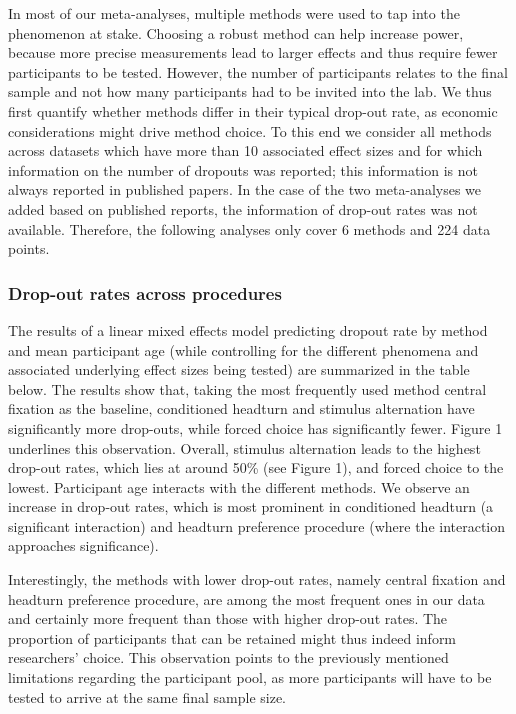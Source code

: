 \documentclass[english,floatsintext,man]{apa6}
\begin{document}
In most of our meta-analyses, multiple methods were used to tap into the
phenomenon at stake. Choosing a robust method can help increase power,
because more precise measurements lead to larger effects and thus
require fewer participants to be tested. However, the number of
participants relates to the final sample and not how many participants
had to be invited into the lab. We thus first quantify whether methods
differ in their typical drop-out rate, as economic considerations might
drive method choice. To this end we consider all methods across datasets
which have more than 10 associated effect sizes and for which
information on the number of dropouts was reported; this information is
not always reported in published papers. In the case of the two
meta-analyses we added based on published reports, the information of
drop-out rates was not available. Therefore, the following analyses only
cover 6 methods and 224 data points.

\subsubsection{Drop-out rates across
procedures}\label{drop-out-rates-across-procedures}

The results of a linear mixed effects model predicting dropout rate by
method and mean participant age (while controlling for the different
phenomena and associated underlying effect sizes being tested) are
summarized in the table below. The results show that, taking the most
frequently used method central fixation as the baseline, conditioned
headturn and stimulus alternation have significantly more drop-outs,
while forced choice has significantly fewer. Figure 1 underlines this
observation. Overall, stimulus alternation leads to the highest drop-out
rates, which lies at around 50\% (see Figure 1), and forced choice to
the lowest. Participant age interacts with the different methods. We
observe an increase in drop-out rates, which is most prominent in
conditioned headturn (a significant interaction) and headturn preference
procedure (where the interaction approaches significance).

Interestingly, the methods with lower drop-out rates, namely central
fixation and headturn preference procedure, are among the most frequent
ones in our data and certainly more frequent than those with higher
drop-out rates. The proportion of participants that can be retained
might thus indeed inform researchers' choice. This observation points to
the previously mentioned limitations regarding the participant pool, as
more participants will have to be tested to arrive at the same final
sample size.
\end{document}
